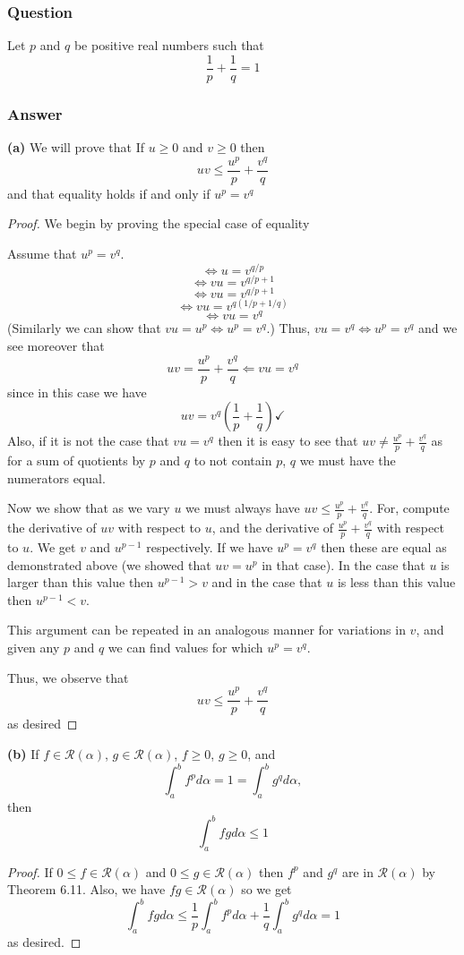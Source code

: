 \documentclass[12pt]{article}
\begin{document}
\subsubsection{Question}
Let $p$ and $q$ be positive real numbers such that 
\[\frac{1}{p}+\frac{1}{q}=1\]
\subsubsection{Answer}
\textbf{(a)} We will prove that If  $u\geq 0$ and $v \geq 0$ then 
\[uv \leq \frac{u^p}{p}+\frac{v^q}{q}\]
and that equality holds if and only if $u^p=v^q$
\begin{proof}
We begin by proving the special case of equality

Assume that $u^p=v^q$. 
\[\Leftrightarrow u=v^{q/p}\]
\[\Leftrightarrow vu=v^{q/p+1}\]
\[\Leftrightarrow vu=v^{q/p+1}\]
\[\Leftrightarrow vu =v^{q(1/p+1/q)}\]
\[\Leftrightarrow vu=v^q\]
(Similarly we can show that $vu=u^p \Leftrightarrow u^p=v^q $.)
Thus, $vu=v^q \Leftrightarrow u^p=v^q $ and we see moreover that 
\[uv = \frac{u^p}{p}+\frac{v^q}{q} \Leftarrow vu=v^q\]
since in this case we have 
\[uv = v^q \left( \frac{1}{p}+\frac{1}{q} \right) \checkmark \]
Also, if it is not the case that $vu=v^q$ then it is easy to see that $uv \neq \frac{u^p}{p}+\frac{v^q}{q}$ as for a sum of quotients by $p$ and $q$ to not contain $p$, $q$ we must have the numerators equal.


Now we show that as we vary $u$ we must always have $uv \leq \frac{u^p}{p}+\frac{v^q}{q}$. For, compute the derivative of $uv$ with respect to $u$, and the derivative of $\frac{u^p}{p}+\frac{v^q}{q}$ with respect to $u$. We get $v$ and $u^{p-1}$ respectively. If we have $u^p=v^q$ then these are equal as demonstrated above (we showed that $u v = u^p$ in that case). In the case that $u$ is larger than this value then $u^{p-1}>v$ and in the case that $u$ is less than this value then $u^{p-1}<v$. 

This argument can be repeated in an analogous manner for variations in $v$, and given any $p$ and $q$ we can find values for which $u^p=v^q$.

Thus, we observe that 
\[uv \leq \frac{u^p}{p}+\frac{v^q}{q}\]
as desired\end{proof}


\textbf{(b)} If $f \in \mathcal{R}(\alpha)$, $g \in \mathcal{R}(\alpha)$, $f\geq0$, $g \geq 0$, and
\[\int_a^b f^p d\alpha = 1 = \int_a^b g^q d\alpha, \]
then
\[\int_a^b f g d\alpha \leq 1\]
\begin{proof}

If $0 \leq f \in \mathcal{R} (\alpha) $ and $0 \leq g \in \mathcal{R}(\alpha)$ then $f^p$ and $g^q$ are in $\mathcal{R}(\alpha)$ by Theorem 6.11. Also, we have $f g \in \mathcal{R}(\alpha)$ so we get
\[\int_a^b f g d\alpha \leq \frac{1}{p} \int_a^b f^p d \alpha + \frac{1}{q} \int_a^b g^q d\alpha = 1\]
as desired.\end{proof}
\end{document}
